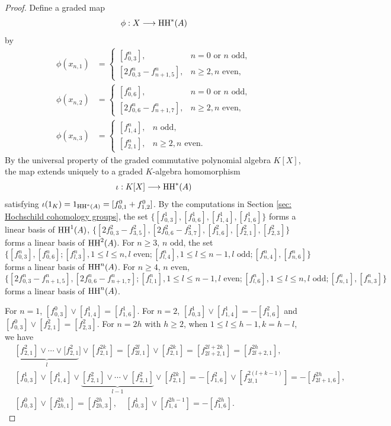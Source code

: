 \documentclass[10pt, reqno]{amsart}
\theoremstyle{definition}
\theoremstyle{remark}
\numberwithin{equation}{section}
\begin{document}
\begin{proof}
Define a graded map
\[
\phi:X\longrightarrow \mathrm{HH}^*(A)
\]
by
\[
\begin{aligned}
\phi(x_{n,1}) &=
\begin{cases}
[f_{0,3}^n], & n = 0 \text{ or } n \text{ odd},\\
[2f_{0,3}^n - f_{n+1,5}^n], & n \ge 2, n \text{ even},
\end{cases} \\
\phi(x_{n,2}) &=
\begin{cases}
[f_{0,6}^n], & n = 0 \text{ or } n \text{ odd},\\
[2f_{0,6}^n - f_{n+1,7}^n], &  n \ge 2, n \text{ even},
\end{cases} \\
\phi(x_{n,3}) &=
\begin{cases}
[f_{1,4}^n], & n \text{ odd},\\
[f_{2,1}^n], & n \ge 2, n \text{ even}.
\end{cases}
\end{aligned}
\]
By the universal property of the graded commutative polynomial algebra \(K[X]\), the map extends uniquely to a graded \(K\)-algebra homomorphism
\[
\iota:K[X]\longrightarrow \mathrm{HH}^*(A)
\]
satisfying
\(
\iota(1_K)= 1_{\mathrm{HH}^*(A)}=[f_{0,1}^0+f_{1,2}^0]\).
\iffalse
By the computations in  Section \ref{sec: Hochschild cohomology groups}, the set \(\{[f_{0,3}^1], [f_{0,6}^1], [f_{1,4}^1], [f_{1,6}^1]\}\) forms a linear basis of \(\mathrm{HH}^1(A)\), \(\{[2f_{0,3}^2-f_{3,5}^2], [2f_{0,6}^2-f_{3,7}^2], [f_{1,6}^2], [f_{2,1}^2], [f_{2,3}^2]\}\) forms a linear basis of \(\mathrm{HH}^2(A)\). For \(n\ge 3\), \(n \text{ odd}\), the set
\[\{[f_{0,3}^n], [f_{0,6}^n]; [f_{l,3}^n], 1\le l \le n, l \text{ even}; [f_{l,4}^n], 1\le l \le n-1, l \text{ odd}; [f_{n,4}^n], [f_{n,6}^n]\}\]
forms a linear basis of \(\mathrm{HH}^n(A)\).  For \(n\ge 4\), \(n \text{ even}\), 
\[\{[2f_{0,3}^n-f_{n+1,5}^n], [2f_{0,6}^n-f_{n+1,7}^n]; [f_{l,1}^n], 1\le l \le n-1, l \text{ even}; [f_{l,6}^n], 1\le l \le n, l \text{ odd}; [f_{n,1}^n], [f_{n,3}^n]\}\]
forms a linear basis of \(\mathrm{HH}^n(A)\). 

For \(n=1\), \([f_{0,3}^0] \lor [f_{1,4}^1]=[f_{1,6}^1]\). For \(n=2\), \([f_{0,3}^1] \lor [f_{1,4}^1]= -[f_{1,6}^2]\) and \([f_{0,3}^0] \lor [f_{2,1}^2]=[f_{2,3}^2]\).
For \(n=2h \) with \(h\ge 2\), when \( 1\le l \le h-1, k=h-l\), we have 
\[\begin{aligned}
   & \underbrace{[f_{2,1}^2] \lor \cdots \lor [f_{2,1}^2}_{l}] \lor [f_{2,1}^{2k}]= [f_{2l,1}^{2l}] \lor [f_{2,1}^{2k}] =[f_{2l+2,1}^{2l+2k}]=[f_{2l+2,1}^{2h}],\\
    &[f_{0,3}^1] \lor [f_{1,4}^1] \lor \underbrace{[f_{2,1}^2] \lor \cdots \lor [f_{2,1}^2]}_{l-1} \lor [f_{2,1}^{2k}]= -[f_{1,6}^2] \lor [f_{2l,1}^{2(l+k-1)}] = -[f_{2l+1,6}^{2h}], \\
   & [f_{0,3}^0] \lor [f_{2h,1}^{2h}] = [f_{2h,3}^{2h}], \quad [f_{0,3}^1] \lor [f_{1,4}^{2h-1}]=-[f_{1,6}^{2h}].
\end{aligned}
\]


\end{proof}
\end{document}

